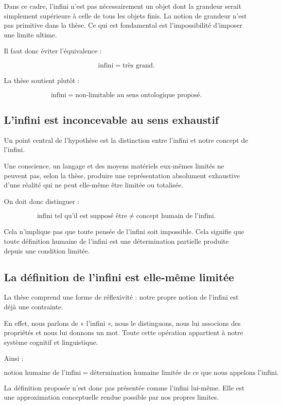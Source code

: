 \documentclass[11pt,a4paper]{article}
\begin{document}
Dans ce cadre, l'infini n'est pas nécessairement un objet dont la grandeur serait simplement supérieure à celle de tous les objets finis. La notion de grandeur n'est pas primitive dans la thèse. Ce qui est fondamental est l'impossibilité d'imposer une limite ultime.

Il faut donc éviter l'équivalence :

\[
\text{infini} = \text{très grand}.
\]

La thèse soutient plutôt :

\[
\text{infini} = \text{non-limitable au sens ontologique proposé}.
\]

\subsection{L'infini est inconcevable au sens exhaustif}

Un point central de l'hypothèse est la distinction entre l'infini et notre concept de l'infini.

Une conscience, un langage et des moyens matériels eux-mêmes limités ne peuvent pas, selon la thèse, produire une représentation absolument exhaustive d'une réalité qui ne peut elle-même être limitée ou totalisée.

On doit donc distinguer :

\[
\boxed{
\text{infini tel qu'il est supposé être} \neq \text{concept humain de l'infini}.
}
\]

Cela n'implique pas que toute pensée de l'infini soit impossible. Cela signifie que toute définition humaine de l'infini est une détermination partielle produite depuis une condition limitée.

\subsection{La définition de l'infini est elle-même limitée}

La thèse comprend une forme de réflexivité : notre propre notion de l'infini est déjà une contrainte.

En effet, nous parlons de « l'infini », nous le distinguons, nous lui associons des propriétés et nous lui donnons un mot. Toute cette opération appartient à notre système cognitif et linguistique.

Ainsi :

\[
\boxed{
\text{notion humaine de l'infini} = \text{détermination humaine limitée de ce que nous appelons l'infini}.
}
\]

La définition proposée n'est donc pas présentée comme l'infini lui-même. Elle est une approximation conceptuelle rendue possible par nos propres limites.
\end{document}
